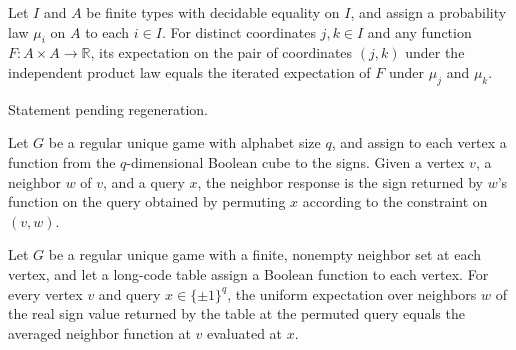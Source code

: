 \begin{theorem}
\label{FABL.RegularUniqueGame.pmfExpectation_independentProductPMF_two_coordinates}
\leanok
{}
Let $I$ and $A$ be finite types with decidable equality on $I$, and assign a probability
law $\mu_i$ on $A$ to each $i\in I$. For distinct coordinates $j,k\in I$ and any
function $F:A\times A\to\mathbb{R}$, its expectation on the pair of coordinates $(j,k)$
under the independent product law equals the iterated expectation of $F$ under $\mu_j$
and $\mu_k$.
\end{theorem}

\begin{theorem}
\label{FABL.RegularUniqueGame.randomizedValue_ofBoolean}
\leanok
{}
Statement pending regeneration.
\end{theorem}

\begin{definition}
\label{FABL.RegularUniqueGame.neighborResponse}
\leanok
{}
Let $G$ be a regular unique game with alphabet size $q$, and assign to each vertex a
function from the $q$-dimensional Boolean cube to the signs. Given a vertex $v$, a
neighbor $w$ of $v$, and a query $x$, the neighbor response is the sign returned by
$w$'s function on the query obtained by permuting $x$ according to the constraint on
$(v,w)$.
\end{definition}

\begin{theorem}
\label{FABL.RegularUniqueGame.pmfExpectation_neighborResponse}
\leanok
{}
Let $G$ be a regular unique game with a finite, nonempty neighbor set at each vertex,
and let a long-code table assign a Boolean function to each vertex. For every vertex $v$
and query $x\in\{\pm1\}^q$, the uniform expectation over neighbors $w$ of the real sign
value returned by the table at the permuted query equals the averaged neighbor function
at $v$ evaluated at $x$.
\end{theorem}

